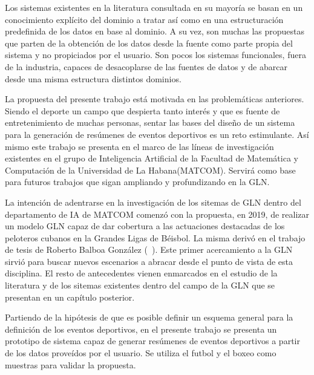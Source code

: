     Los sistemas existentes en la literatura consultada en su mayoría se basan en un conocimiento explícito del dominio a tratar así como en una 
estructuración predefinida de los datos en base al dominio. A su vez, son muchas las propuestas que parten de la obtención de los datos desde 
la fuente como parte propia del sistema y no propiciados por el usuario. Son pocos los sistemas funcionales, fuera de la industria, capaces de 
desacoplarse de las fuentes de datos y de abarcar desde una misma estructura distintos dominios.



    La propuesta del presente trabajo está motivada en las problemáticas anteriores. Siendo el deporte un campo que despierta tanto 
interés y que es fuente de entretenimiento de muchas personas, sentar las bases del diseño de un sistema para la generación de resúmenes de 
eventos deportivos es un reto estimulante. Así mismo este trabajo se presenta en el marco de las líneas de investigación existentes en el 
grupo de Inteligencia Artificial de la Facultad de Matemática y Computación de la Universidad de La Habana(MATCOM). Servirá como base 
para futuros trabajos que sigan ampliando y profundizando en la GLN.

    La intención de adentrarse en la investigación de los sitemas de GLN dentro del departamento de IA de MATCOM comenzó con la propuesta, en 2019, 
de realizar un modelo GLN capaz de dar cobertura a las actuaciones destacadas de los peloteros cubanos en la Grandes Ligas de Béisbol. La misma derivó 
en el trabajo de tesis de Roberto Balboa González (~\cite{balboa2020}). Este primer acercamiento a la GLN sirvió para buscar nuevos escenarios a abracar 
desde el punto de vista de esta disciplina. El resto de antecedentes vienen enmarcados en el estudio de la literatura y de los sitemas existentes dentro del campo de la GLN que 
se presentan en un capítulo posterior.

    
    Partiendo de la hipótesis de que es posible definir un esquema general para la definición de los eventos deportivos, en el presente trabajo
se presenta un prototipo de sistema capaz de generar resúmenes de eventos deportivos a partir de los datos prove\'idos por 
el usuario. Se utiliza el futbol y el boxeo como muestras para validar la propuesta. 

